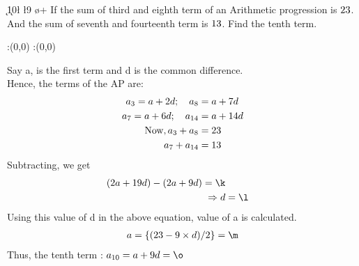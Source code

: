 


\SUBTRACT\vbtwo\vbone\k
\DIVIDE\k{10}\l
\MULTIPLY\l{9}\n 
\gcalcexpr[0]  
\gcalcexpr[0]\o {\m+\n}
\question[5] If the sum of third and eighth term of an Arithmetic progression is $23$. And the sum of seventh and fourteenth term is $13$. Find the tenth term. 


\watchout

\ifprintanswers
  \begin{marginfigure}
      :(0,0)
      :(0,0)
    \figdrawbegin{}
      \figdrawline [100,101]
    \figdrawend
    \figvisu{\figBoxA}{}{%
    }
    \centerline{\box\figBoxA}
  \end{marginfigure}
\fi 

\begin{solution}[\fullpage]
Say a, is the first term and d is the common difference.\\
Hence, the terms of the AP are:\\
\begin{align}
{a}_{3} = a + 2d ;\quad {a}_{8} &= a + 7d \\
{a}_{7} = a + 6d ;\quad {a}_{14} &= a + 14d\\
\text{Now}, {a}_{3} + {a}_{8} &= 23\\
\quad {a}_{7} + {a}_{14} &= 13
\end{align}
Subtracting, we get\\
\begin{align}
(2{a} + 19d) - (2{a} +  9d) = \k \\
\Rightarrow d &= \l \\
\end{align}
Using this value of d in the above equation, value of a is calculated.   
\begin{align}
a = \lbrace (\vbone - 9\times d)/ 2 \rbrace = \m 
\end{align}
Thus, the tenth term : ${a}_{10} = a + 9d = \o $\\
\end{solution}

